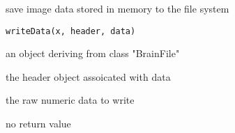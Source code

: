 \begin{Description}\relax
save image data stored in memory to the file system
\end{Description}
\begin{Usage}
\begin{verbatim}
writeData(x, header, data)
\end{verbatim}
\end{Usage}
\begin{Arguments}
\begin{ldescription}
\item[\code{x}] an object deriving from class "BrainFile" 
\item[\code{header}] the header object assoicated with data 
\item[\code{data}] the raw numeric data to write 
\end{ldescription}
\end{Arguments}
\begin{Value}
no return value
\end{Value}

